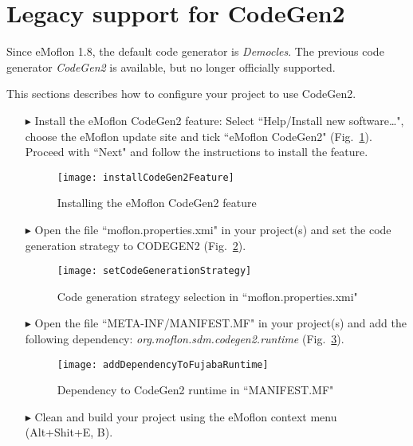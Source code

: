 \newpage
\section{Legacy support for CodeGen2}
\genHeader

Since eMoflon 1.8, the default code generator is \emph{Democles}.
The previous code generator \emph{CodeGen2} is available, but no longer
officially supported.

This sections describes how to configure your project to use CodeGen2.

\begin{itemize}

\item[$\blacktriangleright$] 
Install the eMoflon CodeGen2 feature:
Select ``Help/Install new software\dots", choose the eMoflon update site and tick
``eMoflon CodeGen2" (Fig.~\ref{legacyCodegen2:installCodeGen2Feature}).
Proceed with ``Next" and follow the instructions to install the feature.

\begin{figure}[htbp]
    \begin{center} 
        \texttt{[image: installCodeGen2Feature]}
        \caption{Installing the eMoflon CodeGen2 feature}  
        \label{legacyCodegen2:installCodeGen2Feature}
    \end{center}
\end{figure}


\item[$\blacktriangleright$] 
Open the file ``moflon.properties.xmi" in your project(s) and set the code generation strategy to CODEGEN2  (Fig.~\ref{legacyCodegen2:changeCodeGenerationstrategy}).

\begin{figure}[htbp]
    \begin{center} 
        \texttt{[image: setCodeGenerationStrategy]}
        \caption{Code generation strategy selection in ``moflon.properties.xmi"}  
        \label{legacyCodegen2:changeCodeGenerationstrategy}
    \end{center}
\end{figure}


\item[$\blacktriangleright$] 
Open the file ``META-INF/MANIFEST.MF" in your project(s) and add the following dependency: \emph{org.moflon.sdm.codegen2.runtime} (Fig.~\ref{legacyCodegen2:addDependencyToFujabaRuntime}).

\begin{figure}[htbp]
    \begin{center} 
        \texttt{[image: addDependencyToFujabaRuntime]}
        \caption{Dependency to CodeGen2 runtime in ``MANIFEST.MF"}  
        \label{legacyCodegen2:addDependencyToFujabaRuntime}
    \end{center}
\end{figure}

\item[$\blacktriangleright$] 
Clean and build your project using the eMoflon context menu (Alt+Shit+E, B).

\end{itemize}
